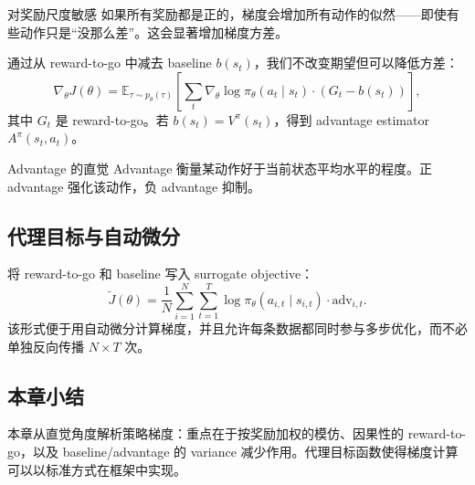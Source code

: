 \begin{warningbox}{对奖励尺度敏感}
如果所有奖励都是正的，梯度会增加所有动作的似然——即使有些动作只是“没那么差”。这会显著增加梯度方差。
\end{warningbox}

通过从 reward-to-go 中减去 baseline $b(s_t)$，我们不改变期望但可以降低方差：
$$\nabla_\theta J(\theta) = \mathbb{E}_{\tau \sim p_\theta(\tau)} \left[\sum_t \nabla_\theta \log \pi_\theta(a_t \mid s_t) \cdot (G_t - b(s_t))\right],$$
其中 $G_t$ 是 reward-to-go。若 $b(s_t)=V^\pi(s_t)$，得到 advantage estimator $A^\pi(s_t,a_t)$。

\begin{importantbox}{Advantage 的直觉}
Advantage 衡量某动作好于当前状态平均水平的程度。正 advantage 强化该动作，负 advantage 抑制。
\end{importantbox}

\subsection{代理目标与自动微分}

将 reward-to-go 和 baseline 写入 surrogate objective：
$$\tilde{J}(\theta) = \frac{1}{N}\sum_{i=1}^{N}\sum_{t=1}^{T} \log \pi_\theta(a_{i,t} \mid s_{i,t}) \cdot \text{adv}_{i,t}.$$
该形式便于用自动微分计算梯度，并且允许每条数据都同时参与多步优化，而不必单独反向传播 $N \times T$ 次。

\subsection{本章小结}

本章从直觉角度解析策略梯度：重点在于按奖励加权的模仿、因果性的 reward-to-go，以及 baseline/advantage 的 variance 减少作用。代理目标函数使得梯度计算可以以标准方式在框架中实现。

